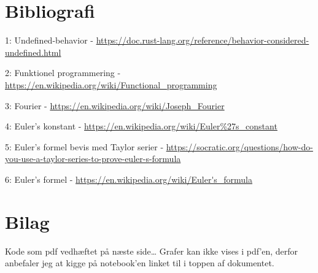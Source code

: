 \documentclass[11pt,a4paper]{article}
\begin{document}
\section{Bibliografi}
\label{sec:org7659e51}

1: Undefined-behavior - \url{https://doc.rust-lang.org/reference/behavior-considered-undefined.html}

2: Funktionel programmering - \url{https://en.wikipedia.org/wiki/Functional\_programming}

3: Fourier - \url{https://en.wikipedia.org/wiki/Joseph\_Fourier}

4: Euler's konstant - \url{https://en.wikipedia.org/wiki/Euler\%27s\_constant}

5: Euler's formel bevis med Taylor serier - \url{https://socratic.org/questions/how-do-you-use-a-taylor-series-to-prove-euler-s-formula}

6: Euler's formel - \url{https://en.wikipedia.org/wiki/Euler's\_formula}

\section{Bilag}
\label{sec:orgf4fd99f}

Kode som pdf vedhæftet på næste side\ldots{}
Grafer kan ikke vises i pdf'en, derfor anbefaler jeg at kigge på notebook'en linket til i toppen af dokumentet.


\end{document}
